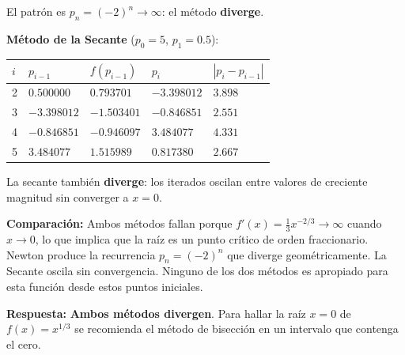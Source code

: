 \documentclass[12pt,a4paper]{article}
\begin{document}
El patr\'on es $p_n = (-2)^n \to \infty$: el m\'etodo \textbf{diverge}.

\textbf{M\'etodo de la Secante} ($p_0 = 5$, $p_1 = 0.5$):

\begin{center}\small
\begin{tabular}{C{0.5cm}C{2.2cm}C{2.2cm}C{2.4cm}C{1.8cm}}
\toprule
$i$ & $p_{i-1}$ & $f(p_{i-1})$ & $p_i$ & $|p_i-p_{i-1}|$ \\
 & $0.500000$ & $0.793701$ & $-3.398012$ & $3.898$ \\
3 & $-3.398012$ & $-1.503401$ & $-0.846851$ & $2.551$ \\
4 & $-0.846851$ & $-0.946097$ & $3.484077$ & $4.331$ \\
5 & $3.484077$ & $1.515989$ & $0.817380$ & $2.667$ \\
\bottomrule
\end{tabular}
\end{center}

La secante tambi\'en \textbf{diverge}: los iterados oscilan entre valores de creciente magnitud sin converger a $x=0$.

\textbf{Comparaci\'on:} Ambos m\'etodos fallan porque $f'(x) = \frac{1}{3}x^{-2/3} \to \infty$ cuando $x \to 0$, lo que implica que la ra\'iz es un punto cr\'itico de orden fraccionario. Newton produce la recurrencia $p_n = (-2)^n$ que diverge geom\'etricamente. La Secante oscila sin convergencia. Ninguno de los dos m\'etodos es apropiado para esta funci\'on desde estos puntos iniciales.

\textbf{Respuesta:} \textbf{Ambos m\'etodos divergen}. Para hallar la ra\'iz $x=0$ de $f(x) = x^{1/3}$ se recomienda el m\'etodo de bisecci\'on en un intervalo que contenga el cero.
\end{document}
